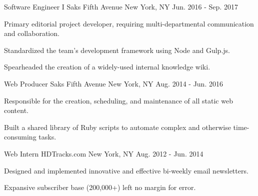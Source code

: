 \begin{cventries}
  \cventry
    {Software Engineer I} %
    {Saks Fifth Avenue} %
    {New York, NY} %
    {Jun. 2016 - Sep. 2017} %
    {
      \begin{cvitems} %
       \item {Primary editorial project developer, requiring multi-departmental communication and collaboration.}
       \item {Standardized the team's development framework using Node and Gulp.js.}
       \item {Spearheaded the creation of a widely-used internal knowledge wiki.}
      \end{cvitems}
    }    

  \cventry
    {Web Producer} %
    {Saks Fifth Avenue} %
    {New York, NY} %
    {Aug. 2014 - Jun. 2016} %
    {
      \begin{cvitems} %
        \item {Responsible for the creation, scheduling, and maintenance of all static web content.}
        \item {Built a shared library of Ruby scripts to automate complex and otherwise time-consuming tasks.}
      \end{cvitems}
    }

  \cventry
    {Web Intern} %
    {HDTracks.com} %
    {New York, NY} %
    {Aug. 2012 - Jun. 2014} %
    {
      \begin{cvitems} %
        \item {Designed and implemented innovative and effective bi-weekly email newsletters.}
        \item {Expansive subscriber base (200,000+) left no margin for error.}
      \end{cvitems}
    }


\end{cventries}
